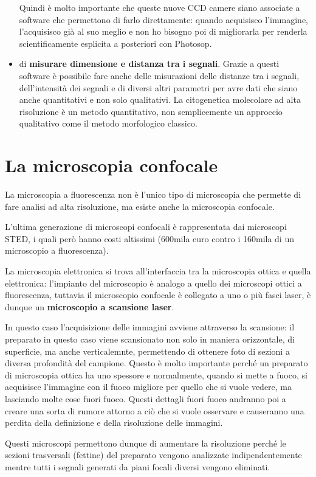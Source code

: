 \documentclass[11pt]{book}
\begin{document}
\begin{itemize}
Quindi è molto importante che queste nuove CCD camere siano associate a software che permettono di farlo direttamente: quando acquisisco l’immagine, l’acquisisco già al suo meglio e non ho bisogno poi di migliorarla per renderla scientificamente esplicita a posteriori con Photosop.
\item di \textbf{misurare dimensione e distanza tra i segnali}.
Grazie a questi software è possibile fare anche delle misurazioni delle distanze tra i segnali, dell’intensità dei segnali e di diversi altri parametri per avre dati che siano anche quantitativi e non solo qualitativi. La citogenetica molecolare ad alta risoluzione è un metodo quantitativo, non semplicemente un approccio qualitativo come il metodo morfologico classico.
\end{itemize}


\section{La microscopia confocale}
La microscopia a fluorescenza non è l'unico tipo di microscopia che permette di fare analisi ad alta risoluzione, ma esiste anche la microscopia confocale. 

L'ultima generazione di microscopi confocali è rappresentata dai microscopi STED, i quali però hanno costi altissimi (600mila euro contro i 160mila di un microscopio a fluorescenza).

La microscopia elettronica si trova all'interfaccia tra la microscopia ottica e quella elettronica: l'impianto del microscopio è analogo a quello dei microscopi ottici a fluorescenza, tuttavia il microscopio confocale è collegato a uno o più fasci laser, è dunque un \textbf{microscopio a scansione laser}.

In questo caso l’acquisizione delle immagini avviene attraverso la scansione: il preparato in questo caso viene scansionato non solo in maniera orizzontale, di superficie, ma anche verticalemnte, permettendo di ottenere foto di sezioni a diversa profondità del campione. Questo è molto importante perché un preparato di microscopia ottica ha uno spessore e normalmente, quando si mette a fuoco, si acquisisce l’immagine con il fuoco migliore per quello che si vuole vedere, ma lasciando molte cose fuori fuoco. Questi dettagli fuori fuoco andranno poi a creare una sorta di rumore attorno a ciò che si vuole osservare e causeranno una perdita della definizione e della risoluzione delle immagini.

Questi microscopi permettono dunque di aumentare la risoluzione perché le sezioni trasversali (fettine) del preparato vengono analizzate indipendentemente mentre tutti i segnali generati da piani focali diversi vengono eliminati.
  
\end{document}

